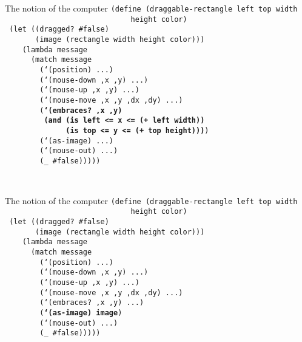 \begin{frame}{The notion of the computer}
  \small
  \texttt{(define (draggable-rectangle left top width \\
    \ \ \ \ \ \ \ \ \ \ \ \ \ \ \ \ \ \ \ \ \ \ \ \ \ \ \ \ \ height color)\\
    \ (let ((dragged? \#false)\\
  \ \ \ \ \ \ \ (image (rectangle width height color)))\\
  \ \ \ \ (lambda message\\
  \ \ \ \ \ \ (match message\\
  \ \ \ \ \ \ \ \ (`(position) ...)\\
  \ \ \ \ \ \ \ \ (`(mouse-down ,x ,y) ...)\\
  \ \ \ \ \ \ \ \ (`(mouse-up ,x ,y) ...)\\
  \ \ \ \ \ \ \ \ (`(mouse-move ,x ,y ,dx ,dy) ...)\\
  \ \ \ \ \ \ \ \ (\textbf{`(embraces? ,x ,y) \\
    \ \ \ \ \ \ \ \ \ (and (is left <= x <= (+ left width))\\
    \ \ \ \ \ \ \ \ \ \ \ \ \ \ (is top <= y <= (+ top height)))})\\
  \ \ \ \ \ \ \ \ (`(as-image) ...)\\
  \ \ \ \ \ \ \ \ (`(mouse-out) ...)\\
  \ \ \ \ \ \ \ \ (\_ \#false)))))\\
  \ \\
  \ 
}
\end{frame}


\begin{frame}{The notion of the computer}
  \small
  \texttt{(define (draggable-rectangle left top width \\
    \ \ \ \ \ \ \ \ \ \ \ \ \ \ \ \ \ \ \ \ \ \ \ \ \ \ \ \ \ height color)\\
    \ (let ((dragged? \#false)\\
  \ \ \ \ \ \ \ (image (rectangle width height color)))\\
  \ \ \ \ (lambda message\\
  \ \ \ \ \ \ (match message\\
  \ \ \ \ \ \ \ \ (`(position) ...)\\
  \ \ \ \ \ \ \ \ (`(mouse-down ,x ,y) ...)\\
  \ \ \ \ \ \ \ \ (`(mouse-up ,x ,y) ...)\\
  \ \ \ \ \ \ \ \ (`(mouse-move ,x ,y ,dx ,dy) ...)\\
  \ \ \ \ \ \ \ \ (`(embraces? ,x ,y) ...)\\
  \ \ \ \ \ \ \ \ (\textbf{`(as-image) image})\\
  \ \ \ \ \ \ \ \ (`(mouse-out) ...)\\
  \ \ \ \ \ \ \ \ (\_ \#false)))))\\
  \ \\
  \ \\
  \ \\
  \ 
}
\end{frame}


